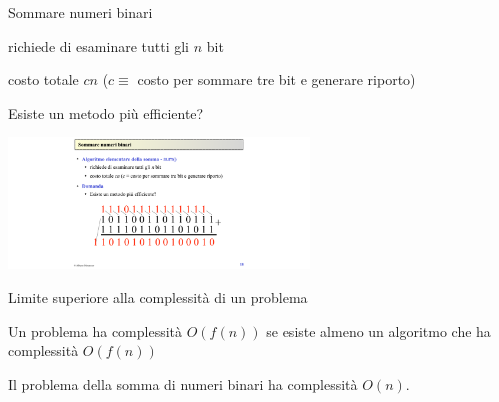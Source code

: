 \begin{frame}{Sommare numeri binari}

\vspace{-9pt}
\begin{myboxtitle}
\BI
\item richiede di esaminare tutti gli $n$ bit
\item costo totale $cn$ ($c \equiv$ costo per sommare tre bit e generare riporto)
\EI
\end{myboxtitle}

\begin{myboxtitle}[Domanda]
Esiste un metodo più efficiente?
\end{myboxtitle}

\medskip
\begin{center}
\includegraphics[width=8cm]{sum.pdf}
\end{center}

\end{frame}

\begin{frame}{Limite superiore alla complessità di un problema}

\vspace{-9pt}
\begin{myboxtitle}
Un problema ha complessità $O(f(n))$ se esiste almeno un algoritmo
che ha complessità $O(f(n))$
\end{myboxtitle}

\bigskip
\begin{myboxtitle}
Il problema della somma di numeri binari ha complessità $O(n)$.
\end{myboxtitle}



\end{frame}



